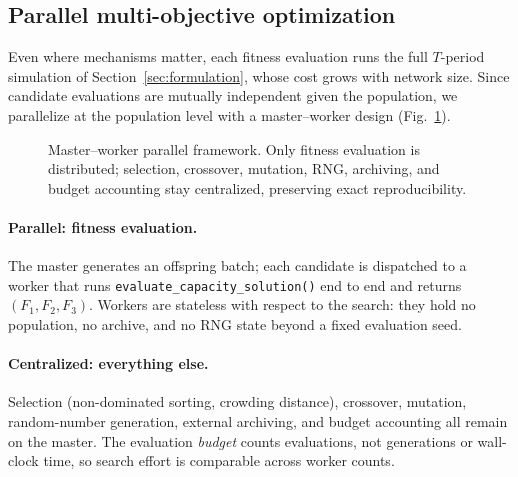 \documentclass[10pt,conference,letterpaper]{IEEEtran}
\begin{document}
\subsection{Parallel multi-objective optimization}
\label{sec:parallel}

Even where mechanisms matter, each fitness evaluation runs the full
$T$-period simulation of Section~\ref{sec:formulation}, whose cost grows
with network size. Since candidate evaluations are mutually independent
given the population, we parallelize at the population level with a
master--worker design (Fig.~\ref{fig:framework}).

\begin{figure}[t]
\centering
{}
\caption{Master--worker parallel framework. Only fitness evaluation is
distributed; selection, crossover, mutation, RNG, archiving, and budget
accounting stay centralized, preserving exact reproducibility.}
\label{fig:framework}
\end{figure}

\paragraph{Parallel: fitness evaluation.}
The master generates an offspring batch; each candidate is dispatched to
a worker that runs \texttt{evaluate\_capacity\_solution()} end to end and
returns $(F_1,F_2,F_3)$. Workers are stateless with respect to the search:
they hold no population, no archive, and no RNG state beyond a fixed
evaluation seed.

\paragraph{Centralized: everything else.}
Selection (non-dominated sorting, crowding distance), crossover,
mutation, random-number generation, external archiving, and budget
accounting all remain on the master. The evaluation \emph{budget} counts
evaluations, not generations or wall-clock time, so search effort is
comparable across worker counts.
\end{document}
